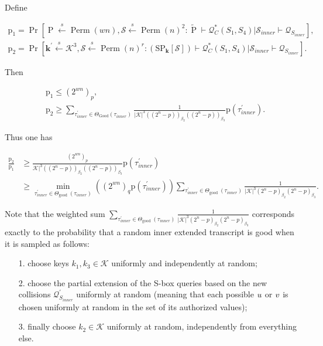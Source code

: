 Define

$$
\begin{aligned}
\mathrm{p}_{1}=\operatorname{Pr}\left[\operatorname{P} \stackrel{s}{\leftarrow} \operatorname{Perm}(w n), \mathcal{S} \stackrel{s}{\leftarrow} \operatorname{Perm}(n)^{2}: \widetilde{\operatorname{P}} \vdash \mathcal{Q}_{C}^{*}\left(S_{1},S_{4}\right) | \mathcal{S}_{inner} \vdash \mathcal{Q}_{S_{inner}}\right],\\
\mathrm{p}_{2}=\operatorname{Pr}\left[\mathbf{k}^{\prime} \stackrel{s}{\leftarrow} \mathcal{K}^{3}, \mathcal{S} \stackrel{s}{\leftarrow} \operatorname{Perm}(n)^{r}:\left(\mathrm{SP}_{\mathbf{k}}[\mathcal{S}]\right) \vdash \mathcal{Q}_{C}^{*}\left(S_{1},S_{4}\right) | \mathcal{S}_{inner} \vdash \mathcal{Q}_{S_{inner}}\right].
\end{aligned}
$$

Then

$$
\begin{aligned}
&\mathrm{p}_{1} \leq \left(2^{w n}\right)_{p},\\
&\mathrm{p}_{2} \geq  \sum_{\tau_{inner}^{\prime} \in \Theta_{\mathrm{Good}}(\tau_{inner})} \frac{1}{|\mathcal{K}|^{3}\left((2^{n}-p)\right)_{\beta_{2}}\left((2^{n}-p)\right)_{\beta_{3}}} \mathrm{p}\left(\tau_{inner}^{\prime}\right).
\end{aligned}
$$

Thus one has

$$
\begin{aligned}
\frac{\mathrm{p}_{2}}{\mathrm{p}_{1}} & \geq \frac{\left(2^{w n}\right)_{p}}{\mathcal{K}|^{3}\left((2^{n}-p)\right)_{\beta_{2}}\left((2^{n}-p)\right)_{\beta_{3}}} \mathrm{p}\left(\tau_{inner}^{\prime}\right)\\
& \geq \min _{\tau_{inner}^{\prime} \in \Theta_{\text {good }}(\tau_{inner})}\left(\left(2^{w n}\right)_{q} \mathrm{p}\left(\tau_{inner}^{\prime}\right)\right) \sum_{\tau_{inner}^{\prime} \in \Theta_{\text {good }}(\tau_{inner})} \frac{1}{|\mathcal{K}|^{3}\left(2^{n}-p\right)_{\beta_{2}}\left(2^{n}-p\right)_{\beta_{3}}}.
\end{aligned}
$$

Note that the weighted sum $\sum_{\tau_{inner}^{\prime} \in \Theta_{\text {good }}(\tau_{inner})} \frac{1}{|\mathcal{K}|^{3}\left(2^{n}-p\right)_{\beta_{2}}\left(2^{n}-p\right)_{\beta_{3}}}$ corresponds exactly to the probability that a random inner extended transcript is good when it is sampled as follows:

\begin{itemize}
  \item[1.]
  choose keys $k_{1}, k_{3} \in \mathcal{K}$  uniformly and independently at random;
  \item[2.]
  choose the partial extension of the S-box queries based on the new collisions $\mathcal{Q}_{S_{inner}}^{\prime}$ uniformly at random (meaning that each possible $\mathnormal{u}$ or $\mathnormal{v}$ is chosen uniformly at random in the set of its authorized values);
  \item[3.]
  finally choose $k_{2} \in \mathcal{K}$ uniformly at random, independently from everything else.
\end{itemize}

